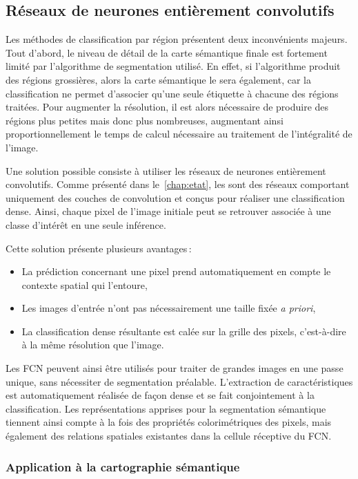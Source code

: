 \subsection{Réseaux de neurones entièrement convolutifs}

Les méthodes de classification par région présentent deux inconvénients majeurs. Tout d'abord, le niveau de détail de la carte sémantique finale est fortement limité par l'algorithme de segmentation utilisé. En effet, si l'algorithme produit des régions grossières, alors la carte sémantique le sera également, car la classification ne permet d'associer qu'une seule étiquette à chacune des régions traitées. Pour augmenter la résolution, il est alors nécessaire de produire des régions plus petites mais donc plus nombreuses, augmentant ainsi proportionnellement le temps de calcul nécessaire au traitement de l'intégralité de l'image.

Une solution possible consiste à utiliser les réseaux de neurones entièrement convolutifs. Comme présenté dans le~\cref{chap:etat}, les  sont des réseaux comportant uniquement des couches de convolution et conçus pour réaliser une classification dense. Ainsi, chaque pixel de l'image initiale peut se retrouver associée à une classe d'intérêt en une seule inférence.

Cette solution présente plusieurs avantages\,:
\begin{itemize}
	\item La prédiction concernant une pixel prend automatiquement en compte le contexte spatial qui l'entoure,
	\item Les images d'entrée n'ont pas nécessairement une taille fixée \emph{a priori},
	\item La classification dense résultante est calée sur la grille des pixels, c'est-à-dire à la même résolution que l'image.
\end{itemize}

Les \gls{FCN} peuvent ainsi être utilisés pour traiter de grandes images en une passe unique, sans nécessiter de segmentation préalable. L'extraction de caractéristiques est automatiquement réalisée de façon dense et se fait conjointement à la classification. Les représentations apprises pour la segmentation sémantique tiennent ainsi compte à la fois des propriétés colorimétriques des pixels, mais également des relations spatiales existantes dans la cellule réceptive du \gls{FCN}.

\subsubsection{Application à la cartographie sémantique}


